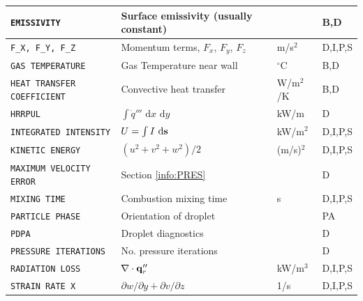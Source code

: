 \documentclass[11pt]{book}
\newcommand{\ct}{\tt\small}
\renewcommand{\d}{\,\mathrm{d}}
\newcommand{\bq}{{\bf q}}
\newcommand{\bs}{{\bf s}}
\newcommand{\dq}{\dot{q}}
\begin{document}
\begin{longtable}{@{\extracolsep{\fill}}|l|l|l|l|}
{\ct EMISSIVITY}                                & Surface emissivity (usually constant)             &                & B,D          \\ \hline
{\ct F\_X, F\_Y, F\_Z}                          & Momentum terms, $F_x$, $F_y$, $F_z$               & m/s$^2$        & D,I,P,S      \\ \hline
{\ct GAS TEMPERATURE}                           & Gas Temperature near wall                         & $^\circ$C      & B,D          \\ \hline
{\ct HEAT TRANSFER COEFFICIENT}                 & Convective heat transfer                          & W/m$^2$/K      & B,D          \\ \hline
{\ct HRRPUL}                                    & $\int \dq''' \, \d x \, \d y$                     & kW/m           & D            \\ \hline
{\ct INTEGRATED INTENSITY}                      & $U=\int I \, \d \bs$                              & kW/m$^2$       & D,I,P,S      \\ \hline
{\ct KINETIC ENERGY}                            & $(u^2+v^2+w^2)/2$                                 & (m/s)$^2$      & D,I,P,S      \\ \hline
{\ct MAXIMUM VELOCITY ERROR}                    & Section \ref{info:PRES}                           &                & D            \\ \hline
{\ct MIXING TIME}                               & Combustion mixing time                            & s              & D,I,P,S      \\ \hline
{\ct PARTICLE PHASE}                            & Orientation of droplet                            &                & PA           \\ \hline
{\ct PDPA}                                      & Droplet diagnostics                               &                & D            \\ \hline
{\ct PRESSURE ITERATIONS}                       & No. pressure iterations                           &                & D            \\ \hline
{\ct RADIATION LOSS}                            & $\nabla \cdot \bq_r''$                            & kW/m$^3$       & D,I,P,S      \\ \hline
{\ct STRAIN RATE X}                             & $\partial w/\partial y + \partial v/\partial z$   & 1/s            & D,I,P,S      \\ \hline

\end{longtable}
\end{document}
